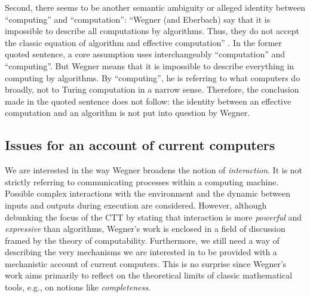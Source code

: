 \documentclass[a4paper, 11pt, twoside]{article}
\begin{document}
Second, there seems to be another semantic ambiguity or alleged identity between ``computing'' and ``computation'': ``Wegner (and Eberbach) say that it is impossible to describe all computations by algorithms. Thus, they do not accept the classic equation of algorithm and effective computation'' \parencite{Cockshott2007}. In the former quoted sentence, a core assumption uses interchangeably ``computation'' and ``computing''. But Wegner means that it is impossible to describe everything in computing by algorithms. By ``computing'', he is referring to what computers do broadly, not to Turing computation in a narrow sense. Therefore, the conclusion made in the quoted sentence does not follow: the identity between an effective computation and an algorithm is not put into question by Wegner. 


\subsection{Issues for an account of current computers}

We are interested in the way Wegner broadens the notion of \textit{interaction}. It is not strictly referring to communicating processes within a computing machine. Possible complex interactions with the environment and the dynamic between inputs and outputs during execution are considered. However, although debunking the focus of the CTT by stating that interaction is more \textit{powerful} and \textit{expressive} than algorithms, Wegner’s work is enclosed in a field of discussion framed by the theory of computability. 
Furthermore, we still need a way of describing the very mechanisms we are interested in to be provided with a mechanistic account of current computers. This is no surprise since Wegner’s work aims primarily to reflect on the theoretical limits of classic mathematical tools, e.g., on notions like \textit{completeness}.
\end{document}

